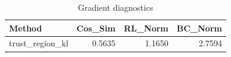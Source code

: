 \begin{table}[htbp]
\centering
\caption{Gradient diagnostics}
\label{tab:grad-diag}
\begin{tabular}{lrrr}
\toprule
\textbf{Method} & \textbf{Cos\_Sim} & \textbf{RL\_Norm} & \textbf{BC\_Norm} \\
\midrule
trust\_region\_kl & 0.5635 & 1.1650 & 2.7594 \\
\bottomrule
\end{tabular}
\end{table}